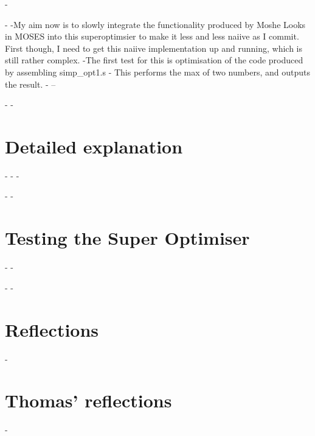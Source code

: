 -\documentclass[11pt]{article}
\begin{document}
-
-My aim now is to slowly integrate the functionality produced by Moshe Looks in MOSES into this superoptimsier to make it less and less naiive as I commit. First though, I need to get this naiive implementation up and running, which is still rather complex. 
-The first test for this is optimisation of the code produced by assembling simp_opt1.s - This performs the max of two numbers, and outputs the result.
-
--\maketitle
-
-\section{Detailed explanation}
-
-
-\maketitle
-
-\section{Testing the Super Optimiser}
-
-\maketitle
-
-\section{Reflections}
-\section{Thomas' reflections}
-
\end{document}
